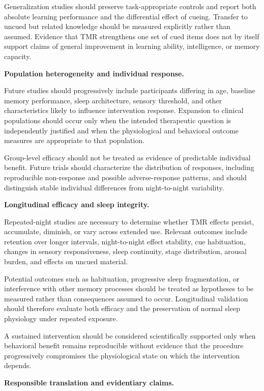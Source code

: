 Generalization studies should preserve task-appropriate controls and report both
absolute learning performance and the differential effect of cueing. Transfer
to uncued but related knowledge should be measured explicitly rather than
assumed. Evidence that TMR strengthens one set of cued items does not by itself
support claims of general improvement in learning ability, intelligence, or
memory capacity.

\noindent\textbf{Population heterogeneity and individual response.}

Future studies should progressively include participants differing in age,
baseline memory performance, sleep architecture, sensory threshold, and other
characteristics likely to influence intervention response. Expansion to
clinical populations should occur only when the intended therapeutic question
is independently justified and when the physiological and behavioral outcome
measures are appropriate to that population.

Group-level efficacy should not be treated as evidence of predictable
individual benefit. Future trials should characterize the distribution of
responses, including reproducible non-response and possible adverse-response
patterns, and should distinguish stable individual differences from
night-to-night variability.

\noindent\textbf{Longitudinal efficacy and sleep integrity.}

Repeated-night studies are necessary to determine whether TMR effects persist,
accumulate, diminish, or vary across extended use. Relevant outcomes include
retention over longer intervals, night-to-night effect stability, cue
habituation, changes in sensory responsiveness, sleep continuity, stage
distribution, arousal burden, and effects on uncued material.

Potential outcomes such as habituation, progressive sleep fragmentation, or
interference with other memory processes should be treated as hypotheses to be
measured rather than consequences assumed to occur. Longitudinal validation
should therefore evaluate both efficacy and the preservation of normal sleep
physiology under repeated exposure.

A sustained intervention should be considered scientifically supported only
when behavioral benefit remains reproducible without evidence that the
procedure progressively compromises the physiological state on which the
intervention depends.

\noindent\textbf{Responsible translation and evidentiary claims.}

